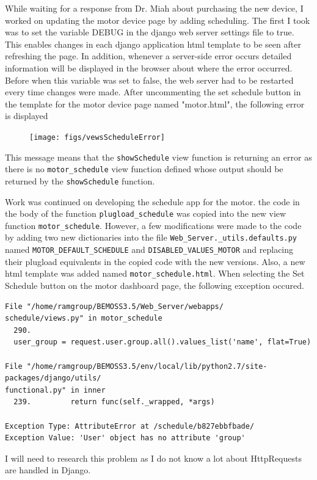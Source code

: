 \documentclass[fontsize=11pt, %
                             paper=letter, %
                             twoside, %
                             captions=tableheading,
                             index=totoc,
                             hyperref]{labbook}
\begin{document}
\begin{addmargin}[0cm]{0cm}
While waiting for a response from Dr. Miah about purchasing the new device, I worked on updating the motor device page by adding scheduling. The first I took was to set the variable DEBUG in the django web server settings file to true. This enables changes in each django application html template to be seen after refreshing the page. In addition, whenever a server-side error occurs detailed information will be displayed in the browser about where the error occurred. Before when this variable was set to false, the web server had to be restarted every time changes were made. 
\smallbreak\noindent
After uncommenting the set schedule button in the template for the motor device page named "motor.html", the following error is displayed
\begin{figure}[H]
\centering
\texttt{[image: figs/vewsScheduleError]}
\end{figure} 
This message means that the \texttt{showSchedule} view function is returning an error as there is no \texttt{motor\_schedule} view function defined whose output should be returned by the \texttt{showSchedule} function.

Work was continued on developing the schedule app for the motor. the code in the body of the function \texttt{plugload\_schedule} was copied into the new view function \texttt{motor\_schedule}. However, a few modifications were made to the code by adding two new dictionaries into the file \texttt{Web\_Server.\_utils.defaults.py} named \texttt{MOTOR\_DEFAULT\_SCHEDULE} and \texttt{DISABLED\_VALUES\_MOTOR} and replacing their plugload equivalents in the copied code with the new versions. Also, a new html template was added named \texttt{motor\_schedule.html}. When selecting the Set Schedule button on the motor dashboard page, the following exception occured.
\begin{Verbatim}
File "/home/ramgroup/BEMOSS3.5/Web_Server/webapps/
schedule/views.py" in motor_schedule
  290.     
  user_group = request.user.group.all().values_list('name', flat=True)

File "/home/ramgroup/BEMOSS3.5/env/local/lib/python2.7/site-packages/django/utils/
functional.py" in inner
  239.         return func(self._wrapped, *args)

Exception Type: AttributeError at /schedule/b827ebbfbade/
Exception Value: 'User' object has no attribute 'group'
\end{Verbatim} 
I will need to research this problem as I do not know a lot about HttpRequests are handled in Django.
\end{addmargin}







\end{document}
